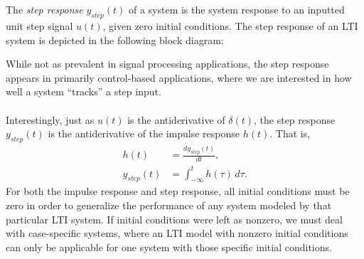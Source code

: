 \documentclass{report}
\begin{document}
\\ \\
The \emph{step response} $y_{step}(t)$ of a system is the system response to an inputted unit step signal $u(t)$, given zero initial conditions. 
The step response of an LTI system is depicted in the following block diagram:
\begin{center}
\end{center}
While not as prevalent in signal processing applications, the step response appears in primarily control-based applications, where 
we are interested in how well a system ``tracks'' a step input.
\\ \\
Interestingly, just as $u(t)$ is the antiderivative of $\delta(t)$, the step response $y_{step}(t)$ is the antiderivative of the impulse response $h(t)$. That is,
\begin{align}
    h(t) &= \frac{dy_{step}(t)}{dt}, \\
    y_{step}(t) &= \int_{-\infty}^{t} h(\tau) \,d\tau.
\end{align}
For both the impulse response and step response, all initial conditions must be zero in order to generalize the performance of any system modeled 
by that particular LTI system. If initial conditions were left as nonzero, we must deal with case-specific systems, where an LTI model with nonzero initial 
conditions can only be applicable for one system with those specific initial conditions. 
\end{document}
